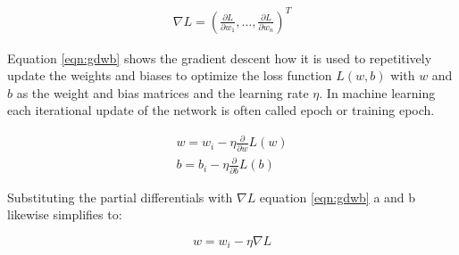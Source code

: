 \begin{eqnarray}
  \nabla L = \left(\frac{\partial L}{\partial w_1}, \ldots ,
  \frac{\partial L}{\partial w_n}\right)^T
 \label{eqn:gd}
\end{eqnarray}

Equation \ref{eqn:gdwb} shows the gradient descent how it is used to repetitively update
the weights and biases to optimize the loss function $L(w,b)$ with $w$ and $b$ as the
weight and bias matrices and the learning rate $\eta$. In machine learning each
iterational update of the network is often called epoch or training epoch.

\begin{subequations}
 \begin{align}
  w = w_i - \eta \frac{\partial}{\partial w}L(w) \\
  b = b_i - \eta \frac{\partial}{\partial b}L(b) 
 \end{align}
 \label{eqn:gdwb}
\end{subequations}

Substituting the partial differentials with $\nabla L$ equation \ref{eqn:gdwb} a and b likewise simplifies to:

\begin{equation}
 w = w_i - \eta \nabla L
 \label{eqn:simplegd} 
\end{equation}

